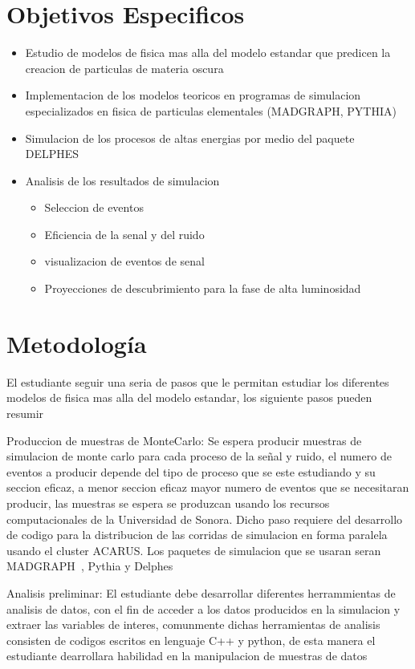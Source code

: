 \chapter{Objetivos Especificos}

\begin{itemize}
    \item Estudio de modelos de fisica mas alla del modelo estandar que predicen la creacion de particulas de materia oscura 
    \item Implementacion de los modelos teoricos en programas de simulacion especializados en fisica de particulas elementales (MADGRAPH, PYTHIA)
    \item Simulacion de los procesos de altas energias por medio del paquete DELPHES 
    \item Analisis de los resultados de simulacion
    \begin{itemize}
        \item Seleccion de eventos 
        \item Eficiencia de la senal y del ruido 
        \item visualizacion de eventos de senal 
        \item Proyecciones de descubrimiento para la fase de alta luminosidad 
    \end{itemize}
\end{itemize}

\chapter{Metodología}

El estudiante seguir una seria de pasos que le permitan estudiar los diferentes modelos de fisica mas alla del modelo estandar, los siguiente pasos pueden resumir 


Produccion de muestras de MonteCarlo: Se espera producir muestras de simulacion de monte carlo para cada proceso de la se\~nal y ruido, el numero de eventos a producir depende del tipo de proceso que se este estudiando y su seccion eficaz, a menor seccion eficaz mayor numero de eventos que se necesitaran producir, las muestras se espera se produzcan usando los recursos computacionales de la Universidad de Sonora. Dicho paso requiere del desarrollo de codigo para la distribucion de las corridas de simulacion en forma paralela usando el cluster ACARUS. Los paquetes de simulacion que se usaran seran MADGRAPH~\cite{Alwall:2007st}, Pythia y Delphes~\cite{deFavereau2014}

Analisis preliminar: El estudiante debe desarrollar diferentes herrammientas de analisis de datos, con el fin de acceder a los datos producidos en la simulacion y extraer las variables de interes, comunmente dichas herramientas de analisis consisten de codigos escritos en lenguaje C++ y python, de esta manera el estudiante dearrollara habilidad en la manipulacion de muestras de datos 

